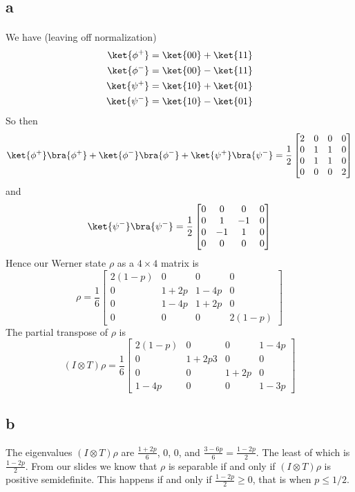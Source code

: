 \documentclass[letterpaper,12pt,oneside,onecolumn]{article}
\begin{document}
\section{}
\subsection{a}
\paragraph{}
We have (leaving off normalization)
\begin{align*}
\ket{\phi^+} &= \ket{00} + \ket{11}\\
\ket{\phi^-} &= \ket{00} - \ket{11} \\
\ket{\psi^+} &= \ket{10} + \ket{01} \\
\ket{\psi^-} &= \ket{10} - \ket{01}
\end{align*}
So then
$$\ket{\phi^+}\bra{\phi^+} + \ket{\phi^-}\bra{\phi^-} + \ket{\psi^+}\bra{\psi^-} = \frac{1}{2}\begin{bmatrix}
2 & 0 & 0 &0 \\
0 & 1 & 1 & 0 \\
0 & 1 & 1 & 0 \\
0 &0 &0 &2
\end{bmatrix}$$
and 
$$\ket{\psi^-}\bra{\psi^-} =\frac{1}{2} \begin{bmatrix}
0 & 0 &0 & 0\\
0 & 1 & -1 & 0 \\
0 & -1 & 1 & 0 \\
0 &0 &0 &0
\end{bmatrix}$$
Hence our Werner state $\rho$ as a $4\times 4$ matrix is
$$\rho = \frac{1}{6}\begin{bmatrix}
2(1-p) & 0 & 0 &0 \\
0 & 1+2p & 1-4p & 0 \\
0 & 1-4p & 1+2p & 0 \\
0 & 0 & 0 & 2(1-p)
\end{bmatrix}$$
The partial transpose of $\rho$ is 
$$(I \otimes T)\rho = \frac{1}{6}\begin{bmatrix}
2(1-p) & 0 & 0 &1-4p \\
0 & 1+2p3 & 0 & 0 \\
0 & 0 & 1+2p & 0 \\
1-4p & 0 & 0 & 1-3p
\end{bmatrix}$$
\subsection{b}
The eigenvalues $(I \otimes T)\rho$ are $\frac{1+2p}{6}$, $0$, $0$, and $\frac{3-6p}{6} = \frac{1-2p}{2}$. The least of which is $\frac{1-2p}{2}$. From our slides we know that $\rho$ is separable if and only if $(I \otimes T)\rho$ is positive semidefinite. This happens if and only if $\frac{1-2p}{2} \geq 0$, that is when $p \leq 1/2$.
\end{document}

